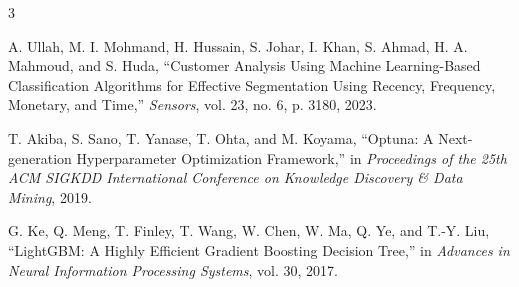 \documentclass[journal,letterpaper]{IEEEtran}
\begin{document}
\begin{thebibliography}{3}

A. Ullah, M. I. Mohmand, H. Hussain, S. Johar, I. Khan, S. Ahmad, H. A. Mahmoud, and S. Huda,
``Customer Analysis Using Machine Learning-Based Classification Algorithms for Effective Segmentation Using Recency, Frequency, Monetary, and Time,''
\emph{Sensors}, vol. 23, no. 6, p. 3180, 2023.

T. Akiba, S. Sano, T. Yanase, T. Ohta, and M. Koyama,
``Optuna: A Next-generation Hyperparameter Optimization Framework,''
in \emph{Proceedings of the 25th ACM SIGKDD International Conference on Knowledge Discovery \& Data Mining}, 2019.

G. Ke, Q. Meng, T. Finley, T. Wang, W. Chen, W. Ma, Q. Ye, and T.-Y. Liu,
``LightGBM: A Highly Efficient Gradient Boosting Decision Tree,''
in \emph{Advances in Neural Information Processing Systems}, vol. 30, 2017.

\end{thebibliography}
\end{document}
